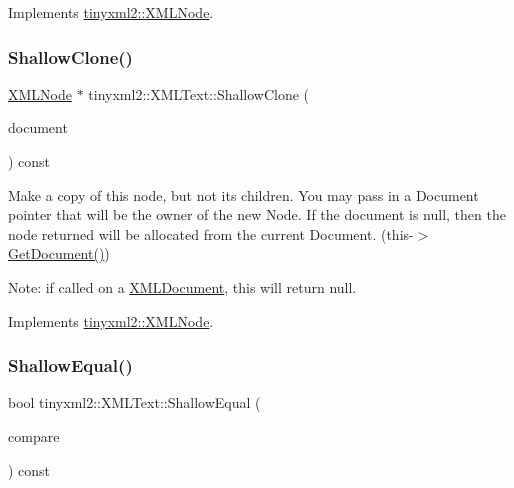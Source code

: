 Implements \mbox{\hyperlink{classtinyxml2_1_1_x_m_l_node_a81e66df0a44c67a7af17f3b77a152785}{tinyxml2\+::\+X\+M\+L\+Node}}.

\mbox{\label{classtinyxml2_1_1_x_m_l_text_a86d265c93152726c8c6831e9594840e6}} 
\subsubsection{\texorpdfstring{Shallow\+Clone()}{ShallowClone()}}
{\footnotesize\ttfamily \mbox{\hyperlink{classtinyxml2_1_1_x_m_l_node}{X\+M\+L\+Node}} $\ast$ tinyxml2\+::\+X\+M\+L\+Text\+::\+Shallow\+Clone (\begin{DoxyParamCaption}\item[{\mbox{\hyperlink{classtinyxml2_1_1_x_m_l_document}{X\+M\+L\+Document}} $\ast$}]{document }\end{DoxyParamCaption}) const\hspace{0.3cm}{\ttfamily [virtual]}}

Make a copy of this node, but not its children. You may pass in a Document pointer that will be the owner of the new Node. If the \textquotesingle{}document\textquotesingle{} is null, then the node returned will be allocated from the current Document. (this-\/$>$\mbox{\hyperlink{classtinyxml2_1_1_x_m_l_node_af343d1ef0b45c0020e62d784d7e67a68}{Get\+Document()}})

Note\+: if called on a \mbox{\hyperlink{classtinyxml2_1_1_x_m_l_document}{X\+M\+L\+Document}}, this will return null. 

Implements \mbox{\hyperlink{classtinyxml2_1_1_x_m_l_node_a8402cbd3129d20e9e6024bbcc0531283}{tinyxml2\+::\+X\+M\+L\+Node}}.

\mbox{\label{classtinyxml2_1_1_x_m_l_text_a99d8bce4dc01df889126e047f358cdfc}} 
\subsubsection{\texorpdfstring{Shallow\+Equal()}{ShallowEqual()}}
{\footnotesize\ttfamily bool tinyxml2\+::\+X\+M\+L\+Text\+::\+Shallow\+Equal (\begin{DoxyParamCaption}\item[{const \mbox{\hyperlink{classtinyxml2_1_1_x_m_l_node}{X\+M\+L\+Node}} $\ast$}]{compare }\end{DoxyParamCaption}) const\hspace{0.3cm}{\ttfamily [virtual]}}

